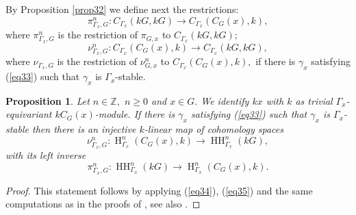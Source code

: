 \documentclass[pdflatex,sn-mathphys-num]{sn-jnl}
\numberwithin{equation}{section}
\theoremstyle{thmstyleone}
\newtheorem{proposition}[theorem]{Proposition}
\theoremstyle{thmstyletwo}
\theoremstyle{thmstylethree}
\newcommand{\Hrm}{\operatorname{H}}
\newcommand{\HH}{\operatorname{HH}}
\begin{document}
By Proposition \ref{prop32} we define  next the restrictions:
\begin{equation} \label{eq34}
\pi_{\Gamma_x,G}^n:C_{\Gamma_x}(kG,kG)\rightarrow C_{\Gamma_x}(C_G(x),k),
\end{equation}
 where $\pi_{\Gamma_x,G}^n$ is the  restriction of $\pi_{G,x}$ to $C_{\Gamma_x}(kG,kG);$
\begin{equation}  \label{eq35}
\nu_{\Gamma_x,G}^n:C_{\Gamma_x}(C_G(x),k)
     \rightarrow C_{\Gamma_x}(kG,kG),
\end{equation}
where $\nu_{\Gamma_x,G}$ is the restriction of $\nu_{G,x}^n$ to $C_{\Gamma_x}(C_G(x),k),$
if there is $\gamma_x$ satisfying (\ref{eq33}) such that $\gamma_x$ is $\Gamma_x$-stable.
\begin{proposition}\label{prop33} Let $n\in \mathbb{Z},$ $n\geq 0$ and $x\in G.$ We identify $kx$ with $k$ as trivial $\Gamma_x$-equivariant $kC_G(x)$-module. If there is $\gamma_x$ satisfying (\ref{eq33}) such that $\gamma_x$ is $\Gamma_x$-stable then there is an injective $k$-linear map of cohomology spaces
    $$\nu_{\Gamma_x,G}^n :  \Hrm_{\Gamma_x}^n(C_G(x),k)
     \rightarrow \HH_{\Gamma_x}^n(kG),$$
with its left inverse
    $$\pi_{\Gamma_x,G}^n:\HH_{\Gamma_x}^n(kG)\rightarrow \Hrm_{\Gamma_x}^n(C_G(x),k).$$
 \end{proposition}
\begin{proof}
This statement follows by applying  (\ref{eq34}), (\ref{eq35})  and the same computations as in the proofs of \cite[Lemma 5.2 a), d), e)]{CoTo}, see also \cite[Remark 5.4]{CoTo}.
\end{proof}
\end{document}
